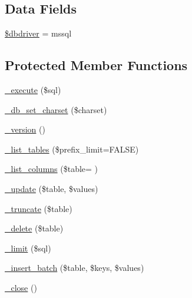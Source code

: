 \subsection*{Data Fields}
\begin{DoxyCompactItemize}
\item 
\hyperlink{class_c_i___d_b__mssql__driver_a0cde2a16322a023d040aa7f725877597}{\$dbdriver} = \textquotesingle{}mssql\textquotesingle{}
\end{DoxyCompactItemize}
\subsection*{Protected Member Functions}
\begin{DoxyCompactItemize}
\item 
\hyperlink{class_c_i___d_b__mssql__driver_a114ab675d89bf8324a41785fb475e86d}{\+\_\+execute} (\$sql)
\item 
\hyperlink{class_c_i___d_b__mssql__driver_a2b808d420d8e9fea0b73ad7127f5efb8}{\+\_\+db\+\_\+set\+\_\+charset} (\$charset)
\item 
\hyperlink{class_c_i___d_b__mssql__driver_ac997a462bb342f97f414910f0e033fb6}{\+\_\+version} ()
\item 
\hyperlink{class_c_i___d_b__mssql__driver_a435c0f3ce54fe7daa178baa8532ebd54}{\+\_\+list\+\_\+tables} (\$prefix\+\_\+limit=F\+A\+L\+S\+E)
\item 
\hyperlink{class_c_i___d_b__mssql__driver_a2a81bb476a5c76fe6f763b0557c1e4c2}{\+\_\+list\+\_\+columns} (\$table= \textquotesingle{}\textquotesingle{})
\item 
\hyperlink{class_c_i___d_b__mssql__driver_a2540b03a93fa73ae74c10d0e16fc073e}{\+\_\+update} (\$table, \$values)
\item 
\hyperlink{class_c_i___d_b__mssql__driver_aa029600528fc1ce660a23ff4b4667f95}{\+\_\+truncate} (\$table)
\item 
\hyperlink{class_c_i___d_b__mssql__driver_a133ea8446ded52589bd22cc9163d0896}{\+\_\+delete} (\$table)
\item 
\hyperlink{class_c_i___d_b__mssql__driver_a3a02ea06541b8ecc25a33a61651562c8}{\+\_\+limit} (\$sql)
\item 
\hyperlink{class_c_i___d_b__mssql__driver_a1978e1358c812587a46e242630365099}{\+\_\+insert\+\_\+batch} (\$table, \$keys, \$values)
\item 
\hyperlink{class_c_i___d_b__mssql__driver_a4d9082658000e5ede8312067c6dda9db}{\+\_\+close} ()
\end{DoxyCompactItemize}
